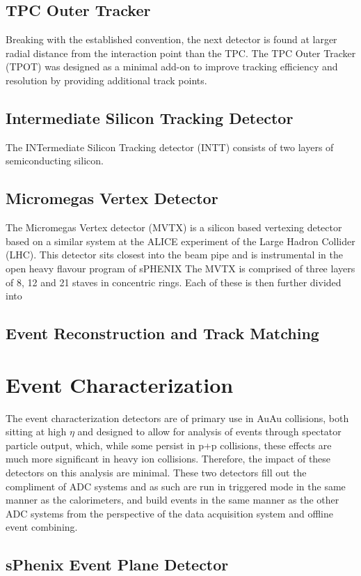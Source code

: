 	\subsection{TPC Outer Tracker}
	Breaking with the established convention, the next detector is found at larger radial distance from the interaction point than the TPC. The TPC Outer Tracker (TPOT) was designed as a minimal add-on to improve tracking efficiency and resolution by providing additional track points. 
	\subsection{Intermediate Silicon Tracking Detector}
	The INTermediate Silicon Tracking detector (INTT) consists of two layers of semiconducting silicon.  
	\subsection{Micromegas Vertex Detector}
	The Micromegas Vertex detector (MVTX) is a silicon based vertexing detector based on a similar system at the ALICE experiment of the Large Hadron Collider (LHC).
	This detector sits closest into the beam pipe and is instrumental in the open heavy flavour program of sPHENIX \cite {sPHENIX_TDR}
	The MVTX is comprised of three layers of 8, 12 and 21 staves in concentric rings. 
	Each of these is then further divided into 
	\subsection{Event Reconstruction and Track Matching}
	\label{sec:events}
\section{Event Characterization}
	The event characterization detectors are of primary use in AuAu collisions, both sitting at high $\eta$ and designed to allow for analysis of events through spectator particle output, which, while some persist in p+p collisions, these effects are much more significant in heavy ion collisions. 
	Therefore, the impact of these detectors on this analysis are minimal.
	\newline
	These two detectors fill out the compliment of ADC systems and as such are run in triggered mode in the same manner as the calorimeters, and build events in the same manner as the other ADC systems from the perspective of the data acquisition system and offline event combining. 
	\subsection{sPhenix Event Plane Detector}
